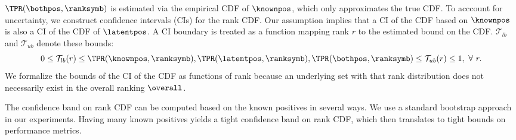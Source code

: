 
$\TPR(\bothpos,\ranksymb)$ is estimated via the empirical CDF of $\knownpos$, which only approximates the true CDF. To acccount for uncertainty, we construct confidence intervals (CIs) for the rank CDF. Our assumption implies that a CI of the CDF based on $\knownpos$ is also a CI of the CDF of $\latentpos$. A CI boundary is treated as a function mapping rank $r$ to the estimated bound on the CDF. $\mathcal{T}_{lb}$ and $\mathcal{T}_{ub}$ denote these bounds:
\begin{equation}
0 \leq \mathcal{T}_{lb}(r) \leq \TPR(\knownpos, \ranksymb), \TPR(\latentpos,\ranksymb), \TPR(\bothpos, \ranksymb) \leq \mathcal{T}_{ub}(r) \leq 1,\ \forall\ r. \label{eq:ci}
\end{equation}
We formalize the bounds of the CI of the CDF as functions of rank because an underlying set with that rank distribution does not necessarily exist in the overall ranking $\overall$.

The confidence band on rank CDF can be computed based on the known positives in several ways. We use a standard bootstrap approach \citep{efron1994introduction} in our experiments. %
Having many known positives yields a tight confidence band on rank CDF, which then translates to tight bounds on performance metrics. 



